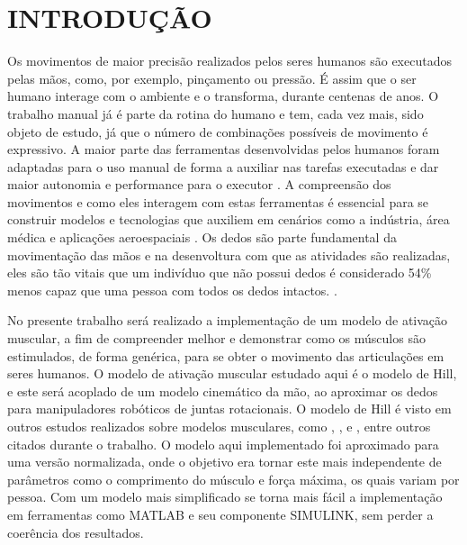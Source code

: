 
\chapter{INTRODUÇÃO}\label{cap1}


Os movimentos de maior precisão realizados pelos seres humanos são executados pelas mãos, como, por exemplo, pinçamento ou pressão. É assim que o ser humano interage com o ambiente e o transforma, durante centenas de anos. O trabalho manual já é parte da rotina do humano e tem, cada vez mais, sido objeto de estudo, já que o número de combinações possíveis de movimento é expressivo. A maior parte das ferramentas desenvolvidas pelos humanos foram adaptadas para o uso manual de forma a auxiliar nas tarefas executadas e dar maior autonomia e performance para o executor \cite{oliveira2016modelagem} \cite{gustus2012human}. A compreensão dos movimentos e como eles interagem com estas ferramentas é essencial para se construir modelos e tecnologias que auxiliem em cenários como a indústria, área médica e aplicações aeroespaciais \cite{rosen1999performances}. Os dedos são parte fundamental da movimentação das mãos e na desenvoltura com que as atividades são realizadas, eles são tão vitais que um indivíduo que não possui dedos é considerado 54\% menos capaz que uma pessoa com todos os dedos intactos.\cite{engelberg1988guides} \cite{oliveira2016modelagem}.

No presente trabalho será realizado a implementação de um modelo de ativação muscular, a fim de compreender melhor e demonstrar como os músculos são estimulados, de forma genérica, para se obter o movimento das articulações em seres humanos. O modelo de ativação muscular estudado aqui é o modelo de Hill, e este será acoplado de um modelo cinemático da mão, ao aproximar os dedos para manipuladores robóticos de juntas rotacionais. O modelo de Hill é visto em outros estudos realizados sobre modelos musculares, como \cite{zajac1989muscle}, \cite{rosen1999performances}, \cite{burke2011motor} e \cite{winters1987biomechanical}, entre outros citados durante o trabalho. O modelo aqui implementado foi aproximado para uma versão normalizada, onde o objetivo era tornar este mais independente de parâmetros como o comprimento do músculo e força máxima, os quais variam por pessoa. Com um modelo mais simplificado se torna mais fácil a implementação em ferramentas como MATLAB e seu componente SIMULINK, sem perder a coerência dos resultados.

